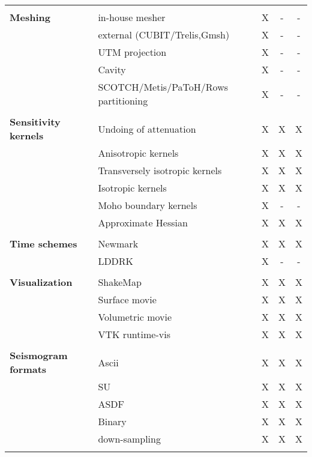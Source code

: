 \begin{table}[htp]
\begin{center}
\begin{tabular}{ l l c c c}
\hline
& & & & \\
{\bf Meshing}           & in-house mesher                       & X  & -  & - \\
                        & external (CUBIT/Trelis,Gmsh)          & X  & -  & - \\
                        & UTM projection                        & X  & -  & - \\
                        & Cavity                                & X  & -  & - \\
                        & SCOTCH/Metis/PaToH/Rows partitioning  & X  & -  & - \\
\hline
& & & & \\
{\bf Sensitivity kernels} & Undoing of attenuation          & X  & X  & X \\
                          & Anisotropic kernels             & X  & X  & X \\
                          & Transversely isotropic kernels  & X  & X  & X \\
                          & Isotropic kernels               & X  & X  & X \\
                          & Moho boundary kernels           & X  & -  & - \\
                          & Approximate Hessian             & X  & X  & X \\
\hline
& & & & \\
{\bf Time schemes}  & Newmark   & X  & X  & X  \\
                    & LDDRK     & X  & -  & -  \\
\hline
& & & & \\
{\bf Visualization} & ShakeMap          & X  & X  & X \\
                    & Surface movie     & X  & X  & X \\
                    & Volumetric movie  & X  & X  & X \\
                    & VTK runtime-vis   & X  & X  & X \\
\hline
& & & & \\
{\bf Seismogram formats}  & Ascii          & X  & X  & X \\
                          & SU             & X  & X  & X \\
                          & ASDF           & X  & X  & X \\
                          & Binary         & X  & X  & X \\
                          & down-sampling  & X  & X  & X \\
%
\hline
& & & & \\ %
\end{tabular}
\end{center}
\end{table}


